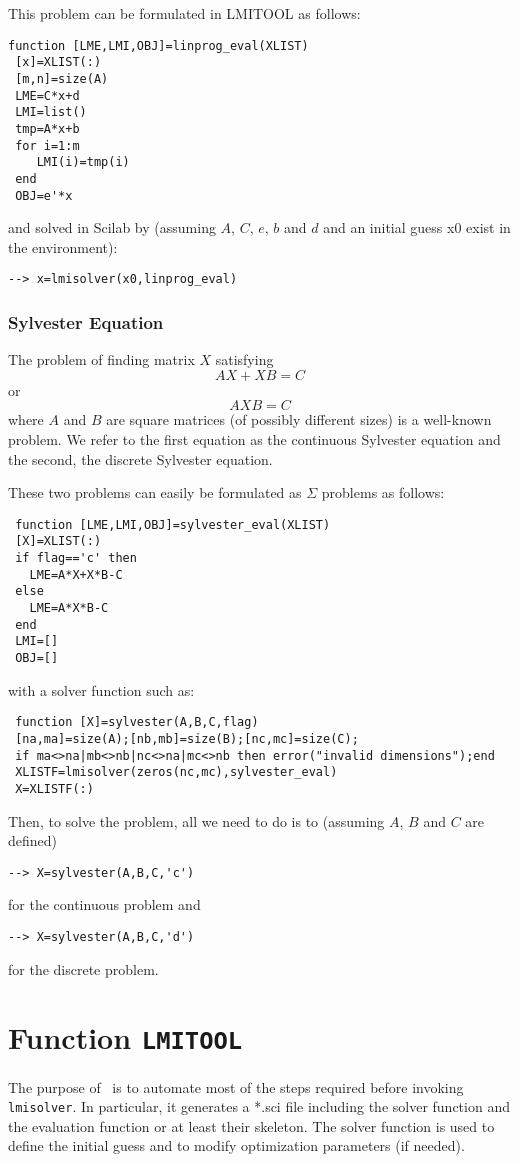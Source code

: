 This problem can be formulated in LMITOOL as follows:
\begin{verbatim}
function [LME,LMI,OBJ]=linprog_eval(XLIST)
 [x]=XLIST(:)
 [m,n]=size(A)
 LME=C*x+d
 LMI=list()
 tmp=A*x+b 
 for i=1:m
    LMI(i)=tmp(i)
 end
 OBJ=e'*x
\end{verbatim}
and solved in Scilab by (assuming $A$, $C$, $e$, $b$ and $d$ and
an initial guess x0 exist in the environment):
\begin{verbatim}
--> x=lmisolver(x0,linprog_eval)
\end{verbatim}

\subsubsection{Sylvester Equation}
\label{ex5}
The problem of finding matrix $X$ satisfying
\[
AX+XB = C
\]
or 
\[
AXB = C
\]
where $A$ and $B$ are square matrices (of possibly different sizes) is
a well-known problem. We refer to the first equation as the continuous
Sylvester equation and the second, the discrete Sylvester equation.

These two problems can easily be formulated as $\Sigma$ problems as
follows:
\begin{verbatim}
 function [LME,LMI,OBJ]=sylvester_eval(XLIST)
 [X]=XLIST(:)
 if flag=='c' then 
   LME=A*X+X*B-C
 else 
   LME=A*X*B-C
 end                                               
 LMI=[]                                                          
 OBJ=[]                                                          
\end{verbatim}
with a solver function such as:
\begin{verbatim}
 function [X]=sylvester(A,B,C,flag)
 [na,ma]=size(A);[nb,mb]=size(B);[nc,mc]=size(C);                                
 if ma<>na|mb<>nb|nc<>na|mc<>nb then error("invalid dimensions");end           
 XLISTF=lmisolver(zeros(nc,mc),sylvester_eval)
 X=XLISTF(:)
\end{verbatim}
Then, to solve the problem, all we need to do is to (assuming $A$, $B$
and $C$ are defined)
\begin{verbatim}
--> X=sylvester(A,B,C,'c')
\end{verbatim}
for the continuous problem and 
\begin{verbatim}
--> X=sylvester(A,B,C,'d')
\end{verbatim}
for the discrete problem.


\newpage

\section{Function {\tt LMITOOL}}
\label{s_lmitool}
The purpose of \lmitool\ is to automate most of the steps required before
invoking {\tt lmisolver}.  In particular, it generates a *.sci
file including the solver function and the evaluation function or at
least their skeleton. The solver function is used to define the
initial guess and to modify optimization parameters (if needed).

